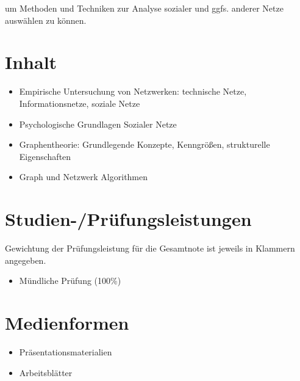 um Methoden und Techniken zur Analyse sozialer und ggfs. anderer Netze
auswählen zu können.

\section*{Inhalt\label{/mi-2017/modulbeschreibungen-master/MA_SC_Modul_Netzwerk--und-Graphentheorie}}\label{inhaltpathlabelmi-2017modulbeschreibungen-mastermaux5fscux5fmodulux5fnetzwerkund-graphentheorie}

\begin{itemize}
\tightlist
\item
  Empirische Untersuchung von Netzwerken: technische Netze,
  Informationsnetze, soziale Netze
\item
  Psychologische Grundlagen Sozialer Netze
\item
  Graphentheorie: Grundlegende Konzepte, Kenngrößen, strukturelle
  Eigenschaften
\item
  Graph und Netzwerk Algorithmen
\end{itemize}

\section*{Studien-/Prüfungsleistungen\label{/mi-2017/modulbeschreibungen-master/MA_SC_Modul_Netzwerk--und-Graphentheorie}}\label{studien-pruxfcfungsleistungenpathlabelmi-2017modulbeschreibungen-mastermaux5fscux5fmodulux5fnetzwerkund-graphentheorie}

Gewichtung der Prüfungsleistung für die Gesamtnote ist jeweils in
Klammern angegeben.

\begin{itemize}
\tightlist
\item
  Mündliche Prüfung (100\%)
\end{itemize}

\section*{Medienformen\label{/mi-2017/modulbeschreibungen-master/MA_SC_Modul_Netzwerk--und-Graphentheorie}}\label{medienformenpathlabelmi-2017modulbeschreibungen-mastermaux5fscux5fmodulux5fnetzwerkund-graphentheorie}

\begin{itemize}
\tightlist
\item
  Präsentationsmaterialien
\item
  Arbeitsblätter
\end{itemize}

